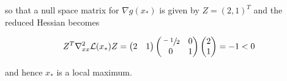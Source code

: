 \begin{solution}
    so that a null space matrix for $\nabla g(x_*)$ is given by $Z = (2, 1)^T$ and the reduced Hessian becomes

    $$
    Z^T \nabla^2_{xx} \mathcal{L}(x_*) Z = \begin{pmatrix*}
        2 & 1
    \end{pmatrix*} \begin{pmatrix*}
        \sfrac{-1}{2} & 0 \\
         0            & 1
    \end{pmatrix*} \begin{pmatrix*}
        2 \\
        1
    \end{pmatrix*} = -1 < 0
    $$

    and hence $x_*$ is a local maximum.
    \ \\
\end{solution}